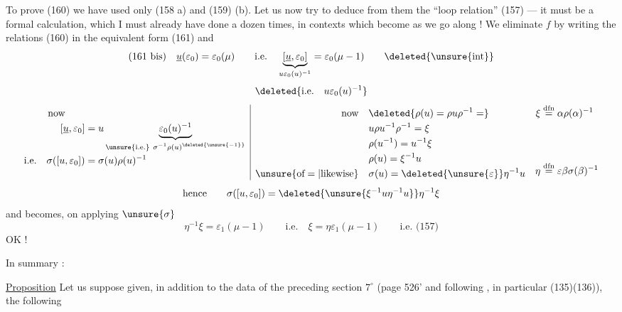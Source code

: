 To prove (160) we have used only (158 a) and (159) (b). Let us now try to deduce from them the ``loop relation'' (157) --- it must be a formal calculation, which I must already have done a dozen times, in contexts which become  as we go along ! We eliminate $f$ by writing the relations (160) in the equivalent form (161) and
\[
(161\ \text{bis})\quad
\underline u(\varepsilon_0)=\varepsilon_0(\mu)
\qquad\text{i.e.}\quad
\underbrace{[\underline u,\varepsilon_0]}_{u\varepsilon_0(u)^{-1}}
=\varepsilon_0(\mu-1)\qquad\deleted{\unsure{\operatorname{int}}}
\]
\[
\deleted{\text{i.e.}\quad u\varepsilon_0(u)^{-1}}
\]
\[
\begin{array}{l|ll}
\begin{aligned}[t]
\text{now}\qquad&\\
[\underline u,\varepsilon_0]&=
u\underbrace{\varepsilon_0(u)^{-1}}_{\substack{\unsure{\text{i.e.}}\ \sigma^{-1}\rho(u)^{\deleted{\unsure{-1}}}}}\\
\text{i.e.}\quad\sigma([u,\varepsilon_0])&=\sigma(u)\rho(u)^{-1}
\end{aligned}
&
\begin{aligned}[t]
\text{now}\quad&\deleted{\rho(u)=\rho u\rho^{-1}=}\\
&u\rho u^{-1}\rho^{-1}=\xi\\
&\rho(u^{-1})=u^{-1}\xi\\
&\rho(u)=\xi^{-1}u\\
\unsure{\text{of}=|\text{likewise}}\quad&\sigma(u)=\deleted{\unsure{\varepsilon}}\eta^{-1}u
\end{aligned}
&
\begin{aligned}[t]
\xi&\overset{\mathrm{dfn}}{=}\alpha\rho(\alpha)^{-1}\\[4em]
\eta&\overset{\mathrm{dfn}}{=}\varepsilon\beta\sigma(\beta)^{-1}
\end{aligned}
\end{array}
\]
\[
\text{hence}\qquad
\sigma([u,\varepsilon_0])=
\deleted{\unsure{\xi^{-1}u\eta^{-1}u}}\eta^{-1}\xi
\]
and \unsure{(*)|($\alpha$)} becomes, on applying $\unsure{\sigma}$
\[
\eta^{-1}\xi=\varepsilon_1(\mu-1)
\qquad\text{i.e.}\quad\xi=\eta\varepsilon_1(\mu-1)
\qquad\text{i.e. (157)}
\]
\hfill OK !


In summary :

\uline{Proposition} Let us suppose given, in addition to the data of the preceding section $7^\circ$ (page 526' and following \unsure{\}|)}, in particular (135)(136)),  the following


